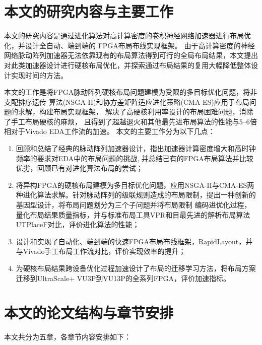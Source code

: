 \section{本文的研究内容与主要工作}

本文的研究内容是通过进化算法对高计算密度的卷积神经网络加速器进行布局优化，并设计全自动、端到端的
FPGA布局布线实现框架。
由于高计算密度的神经网络脉动阵列加速器无法依靠现有的布局算法得到可行的全局布局结果，本文提出
对此类加速器设计进行硬核布局优化，并探索通过布局结果的复用大幅降低整体设计实现时间的方法。

本文的工作是将FPGA脉动阵列硬核布局问题建模为受限的多目标优化问题，将非支配排序遗传
算法(NSGA-II)和协方差矩阵适应进化策略(CMA-ES)应用于布局问题的求解，构建布局实现框架，
解决了高硬核利用率设计的布局困难问题，消除了手工布局硬核的麻烦，
且得到了超越退火和其他最先进布局算法的性能与5--6倍相对于Vivado EDA工作流的加速。
本文的主要工作分为以下几点：

\begin{enumerate}
    \item 回顾和总结了经典的脉动阵列加速器设计，指出加速器计算密度增大和高时钟频率的要求对EDA中的布局问题的挑战,
    并总结已有的FPGA布局算法并比较优劣，回顾已有对进化算法布局的尝试；
    \item 将异构FPGA的硬核布局建模为多目标优化问题，应用NSGA-II与CMA-ES两种进化算法求解。针对脉动阵列的级联规则造成的布局限制，提出一种创新的基因型设计，将布局问题划分为三个子问题并将布局限制
    编码进优化过程，量化布局结果质量指标，并与标准布局工具VPR和目最先进的解析布局算法UTPlaceF对比，评价进化算法的性能；
    \item 设计和实现了自动化、端到端的快速FPGA布局布线框架，RapidLayout，并与Vivado手工布局工作流对比，评价实现效率的提升；
    \item 为硬核布局结果跨设备优化过程加速设计了布局的迁移学习方法，将布局方案迁移到UltraScale+ VU3P到VU13P的全系列FPGA，评价加速指标。
\end{enumerate}




\section{本文的论文结构与章节安排}
\label{sec:arrangement}
本文共分为五章，各章节内容安排如下：

